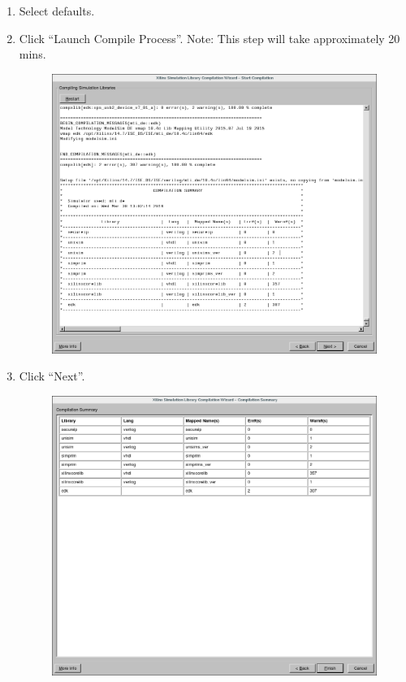 \begin{flushleft}
\begin{flushleft}
\begin{enumerate}
		\item Select defaults.
		\item Click ``Launch Compile Process''.
			\subitem Note: This step will take approximately 20 mins.

	\begin{figure}[H]
	\centering\captionsetup{type=figure}\includegraphics[scale=0.5]{figures/Xilinx_CompXLib_6_CompilationLog}
		\label{fig:wizard_page_6}
	\end{figure}

		\item Click ``Next''.

	\begin{figure}[H]
	\centering\captionsetup{type=figure}\includegraphics[scale=0.5]{figures/Xilinx_CompXLib_7_CompilationSummary}
		\label{fig:wizard_page_7}
	\end{figure}



\end{enumerate}
\end{flushleft}
\end{flushleft}
